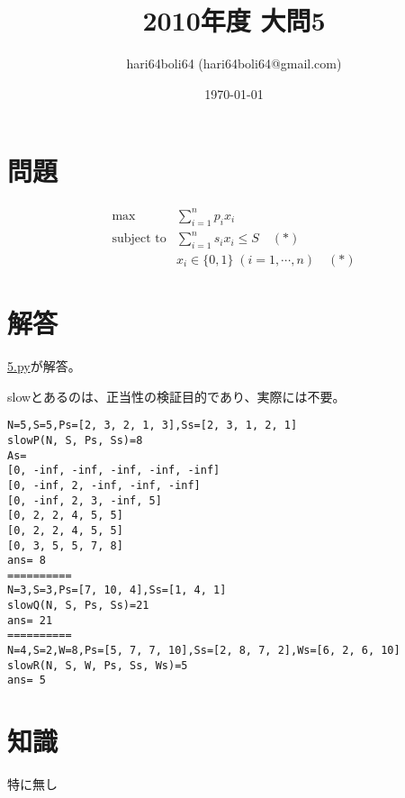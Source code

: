 \documentclass[a4paper, 10pt, dvipdfmx]{jlreq}
\begin{document}
\title{2010年度 大問5}
\author{hari64boli64 (hari64boli64@gmail.com)}
\date{\today}
\maketitle

\section{問題}

\begin{align*}
  \max              & \sum_{i=1}^{n} p_i x_i                      \\
  \text{subject to} & \sum_{i=1}^{n} s_i x_i \leq S \quad (*)     \\
                    & x_i \in \{0,1\} \; (i=1,\cdots,n) \quad (*)
\end{align*}

\section{解答}

\href{./5.py}{5.py}が解答。

slowとあるのは、正当性の検証目的であり、実際には不要。



\begin{lstlisting}[caption=output, label=code:output]
N=5,S=5,Ps=[2, 3, 2, 1, 3],Ss=[2, 3, 1, 2, 1]
slowP(N, S, Ps, Ss)=8
As=
[0, -inf, -inf, -inf, -inf, -inf]
[0, -inf, 2, -inf, -inf, -inf]
[0, -inf, 2, 3, -inf, 5]
[0, 2, 2, 4, 5, 5]
[0, 2, 2, 4, 5, 5]
[0, 3, 5, 5, 7, 8]
ans= 8
==========
N=3,S=3,Ps=[7, 10, 4],Ss=[1, 4, 1]
slowQ(N, S, Ps, Ss)=21
ans= 21
==========
N=4,S=2,W=8,Ps=[5, 7, 7, 10],Ss=[2, 8, 7, 2],Ws=[6, 2, 6, 10]
slowR(N, S, W, Ps, Ss, Ws)=5
ans= 5
\end{lstlisting}

\section{知識}

特に無し
\end{document}
